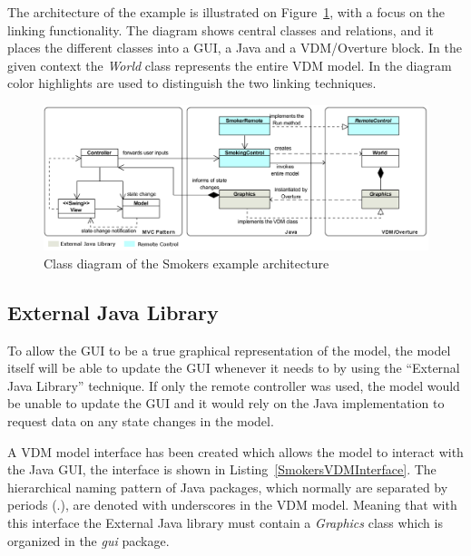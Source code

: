 \documentclass{overturerepchap}
\begin{document}
The architecture of the example is illustrated on Figure~\ref{fig:gui:SmokersExampleCD}, with a focus on the  linking functionality. The diagram shows central classes and relations, and it places the different classes into a GUI, a Java and a VDM/Overture block. In the given context the \textit{World} class represents the entire VDM model. In the diagram color highlights are used to distinguish the two linking techniques.

\begin{figure}[!h]
\begin{center}
  \includegraphics[width=\textwidth]{figures/SmokersExampleCD}
  \caption[labelInTOC]{Class diagram of the Smokers example architecture}
  \label{fig:gui:SmokersExampleCD}
\end{center}
\end{figure}

\subsection{External Java Library}
To allow the GUI to be a true graphical representation of the model, the model itself will be able to update the GUI whenever it needs to by using the ``External Java Library'' technique. If only the remote controller was used, the model would be unable to update the GUI and it would rely on the Java implementation to request data on any state changes in the model. 

A VDM model interface has been created which allows the model to interact with the Java GUI, the interface is shown in Listing~\ref{SmokersVDMInterface}. The hierarchical naming pattern of Java packages, which  normally are separated by periods (.), are denoted with underscores in the VDM model. Meaning that with this interface the External Java library must contain a  \textit{Graphics} class which is organized in the \textit{gui} package.
\end{document}
